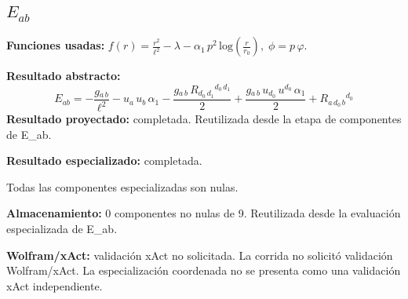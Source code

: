 \documentclass[11pt]{article}
\begin{document}
\subsection*{$ E_{ab} $}
\textbf{Funciones usadas:} $ f\!\left(r\right) = \frac{{r}^{2}}{{\ell}^{2}} - \lambda - \alpha_{1}\,{p}^{2}\,\mathrm{log}\!\left(\frac{r}{r_{0}}\right),\;\phi=p\,\varphi $.\par
\textbf{Resultado abstracto:}
\begin{dmath*}[breakdepth={5}]
E_{ab} = -\frac{g{}_{a\,b}}{{\ell}^{2}} - u{}_{a}\,u{}_{b}\,\alpha_{1} - \frac{g{}_{a\,b}\,R{}_{d_{0}\,d_{1}}{}^{d_{0}\,d_{1}}}{2} + \frac{g{}_{a\,b}\,u{}_{d_{0}}\,u{}^{d_{0}}\,\alpha_{1}}{2} + R{}_{a\,d_{0}\,b}{}^{d_{0}}
\end{dmath*}
\textbf{Resultado proyectado:} completada. Reutilizada desde la etapa de componentes de E\_ab.\par
\textbf{Resultado especializado:} completada.\par
Todas las componentes especializadas son nulas.\par
\textbf{Almacenamiento:} 0 componentes no nulas de 9. Reutilizada desde la evaluación especializada de E\_ab.\par
\textbf{Wolfram/xAct:} validación xAct no solicitada. La corrida no solicitó validación Wolfram/xAct. La especialización coordenada no se presenta como una validación xAct independiente.\par\medskip
{}
\end{document}
